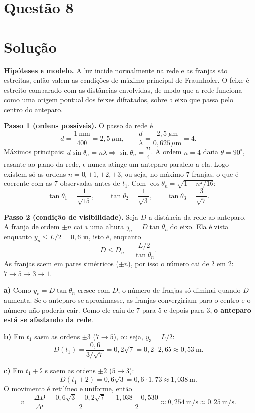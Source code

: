 \documentclass{article}%
\begin{document}
\section*{Questão 8}

\section*{Solução}

\textbf{Hipóteses e modelo.} A luz incide normalmente na rede e as franjas são estreitas, então valem as condições de máximo principal de Fraunhofer. O feixe é estreito comparado com as distâncias envolvidas, de modo que a rede funciona como uma origem pontual dos feixes difratados, sobre o eixo que passa pelo centro do anteparo.

\textbf{Passo 1 (ordens possíveis).} O passo da rede é
\[
d=\frac{1\ \text{mm}}{400}=2{,}5\ \mu\text{m}, \qquad \frac{d}{\lambda}=\frac{2{,}5\ \mu\text{m}}{0{,}625\ \mu\text{m}}=4 .
\]
Máximos principais: $d\sin\theta_n=n\lambda \Rightarrow \sin\theta_n=\dfrac{n}{4}$. A ordem $n=4$ daria $\theta=90^\circ$, rasante ao plano da rede, e nunca atinge um anteparo paralelo a ela. Logo existem só as ordens $n=0,\pm1,\pm2,\pm3$, ou seja, no máximo $7$ franjas, o que é coerente com as $7$ observadas antes de $t_1$. Com $\cos\theta_n=\sqrt{1-n^2/16}$:
\[
\tan\theta_1=\frac{1}{\sqrt{15}},\qquad \tan\theta_2=\frac{1}{\sqrt{3}},\qquad \tan\theta_3=\frac{3}{\sqrt{7}} .
\]

\textbf{Passo 2 (condição de visibilidade).} Seja $D$ a distância da rede ao anteparo. A franja de ordem $\pm n$ cai a uma altura $y_n=D\tan\theta_n$ do eixo. Ela é vista enquanto $y_n\le L/2=0{,}6$ m, isto é, enquanto
\[
D\le D_n=\frac{L/2}{\tan\theta_n}.
\]
As franjas saem em pares simétricos ($\pm n$), por isso o número cai de $2$ em $2$: $7\to5\to3\to1$.

\textbf{a)} Como $y_n=D\tan\theta_n$ cresce com $D$, o número de franjas só diminui quando $D$ aumenta. Se o anteparo se aproximasse, as franjas convergiriam para o centro e o número não poderia cair. Como ele caiu de $7$ para $5$ e depois para $3$, \textbf{o anteparo está se afastando da rede}.

\textbf{b)} Em $t_1$ saem as ordens $\pm3$ ($7\to5$), ou seja, $y_3=L/2$:
\[
D(t_1)=\frac{0{,}6}{3/\sqrt7}=0{,}2\sqrt7=0{,}2\cdot 2{,}65\approx 0{,}53\ \text{m}.
\]

\textbf{c)} Em $t_1+2$ s saem as ordens $\pm2$ ($5\to3$):
\[
D(t_1+2)=0{,}6\sqrt3=0{,}6\cdot1{,}73\approx 1{,}038\ \text{m}.
\]
O movimento é retilíneo e uniforme, então
\[
v=\frac{\Delta D}{\Delta t}=\frac{0{,}6\sqrt3-0{,}2\sqrt7}{2}=\frac{1{,}038-0{,}530}{2}\approx 0{,}254\ \text{m/s}\approx 0{,}25\ \text{m/s}.
\]
\end{document}
